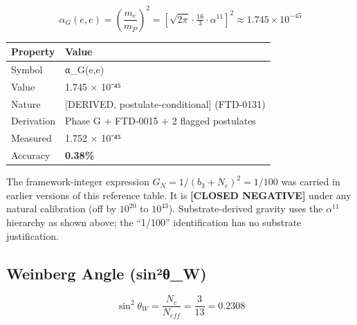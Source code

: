 \documentclass[
  11pt,
  letterpaper,
  twoside,
  openany]{book}
\makeatletter
\let\orig@subsection\subsection
\renewcommand{\subsection}{\needspace{6\baselineskip}\orig@subsection}
\makeatother
\begin{document}
\[
\alpha_G(e,e) = \left(\frac{m_e}{m_P}\right)^2 = \left[\sqrt{2\pi}\cdot\tfrac{16}{3}\cdot\alpha^{11}\right]^2 \approx 1.745 \times 10^{-45}
\]

\begin{longtable}[]{@{}ll@{}}
\toprule\noalign{}
Property & Value \\
\midrule\noalign{}
\endhead
\bottomrule\noalign{}
\endlastfoot
Symbol & α\_G(e,e) \\
Value & 1.745 × 10⁻⁴⁵ \\
Nature & {[}DERIVED, postulate-conditional{]} (FTD-0131) \\
Derivation & Phase G + FTD-0015 + 2 flagged postulates \\
Measured & 1.752 × 10⁻⁴⁵ \\
Accuracy & \textbf{0.38\%} \\
\end{longtable}

\begin{tcolorbox}[enhanced jigsaw, colbacktitle=quarto-callout-warning-color!10!white, titlerule=0mm, bottomtitle=1mm, bottomrule=.15mm, colback=white, arc=.35mm, breakable, toprule=.15mm, title=\textcolor{quarto-callout-warning-color}{\faExclamationTriangle}\hspace{0.5em}{Earlier ``Gravity Bias = 1/100'' reading is closed-negative (FTD-0131)}, rightrule=.15mm, coltitle=black, leftrule=.75mm, colframe=quarto-callout-warning-color-frame, toptitle=1mm, opacityback=0, opacitybacktitle=0.6, left=2mm]

The framework-integer expression \(G_N = 1/(b_3+N_c)^2 = 1/100\) was
carried in earlier versions of this reference table. It is
\textbf{{[}CLOSED NEGATIVE{]}} under any natural calibration (off by
\(10^{20}\) to \(10^{43}\)). Substrate-derived gravity uses the
\(\alpha^{11}\) hierarchy as shown above; the ``1/100'' identification
has no substrate justification.

\end{tcolorbox}

\subsection{Weinberg Angle
(sin²θ\_W)}\label{weinberg-angle-sinuxb2ux3b8_w}

\[
\sin^2\theta_W = \frac{N_c}{N_{eff}} = \frac{3}{13} = 0.2308
\]
\end{document}
